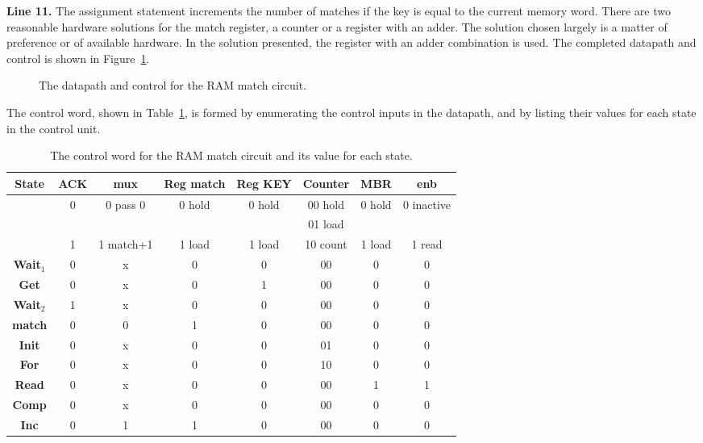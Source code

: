 \textbf{ Line 11.}  The assignment statement increments the number of 
matches if the key is equal to the current memory word.  There
are two reasonable hardware solutions for the match register,
a counter or a register with an adder.  The solution chosen
largely is a matter of preference or of available hardware.
In the solution presented, the register with an adder 
combination is used.  The completed datapath and control is shown in 
Figure~\ref{fig:datapathControlRAMmatch}.

\begin{figure}[ht]
\caption{The datapath and control for the RAM match circuit.}
\label{fig:datapathControlRAMmatch}
\end{figure}

The control word, shown in Table~\ref{table:RAMmatch},
is formed by enumerating the control inputs in the datapath, and by 
listing their values for each state in the control unit.  

\begin{table}
{\tiny
\begin{tabular}{c||c|c|c|c|c|c|c}  
\textbf{ State }  & ACK   & mux       &  Reg match& Reg KEY & Counter     & MBR    & enb     \\ \hline
        & 0     & 0 pass 0  &  0 hold   & 0 hold  					& 00 hold     & 0 hold  & 0 inactive \\ \hline
        &       &           &           &         							& 01 load     &        	&                 \\ \hline
        & 1     & 1 match+1 &  1 load   & 1 load  				& 10 count    & 1 load & 1 read  \\ \hline \hline
\textbf{ Wait$_1$ }  & 0     & x         & 0         & 0       & 00          & 0      & 0             \\ \hline
\textbf{ Get   }  & 0     & x         & 0         & 1       & 00          & 0      & 0              \\ \hline
\textbf{ Wait$_2$ }  & 1     & x         & 0         & 0       & 00          & 0      & 0       \\ \hline
\textbf{ match }   & 0     & 0         & 1         & 0       & 00          & 0      & 0         \\ \hline
\textbf{ Init }   & 0     & x         & 0         & 0       & 01          & 0      & 0            \\ \hline
\textbf{ For  }   & 0     & x         & 0         & 0       & 10          & 0      & 0         \\ \hline
\textbf{ Read }   & 0     & x         & 0         & 0       & 00          & 1      & 1           \\ \hline
\textbf{ Comp }   & 0     & x         & 0         & 0       & 00          & 0      & 0           \\ \hline
\textbf{ Inc }    & 0     & 1         & 1         & 0       & 00          & 0      & 0           \\ 
\end{tabular}
}
\caption{The control word for the RAM match circuit and its value for each state.}
\label{table:RAMmatch}
\end{table}


